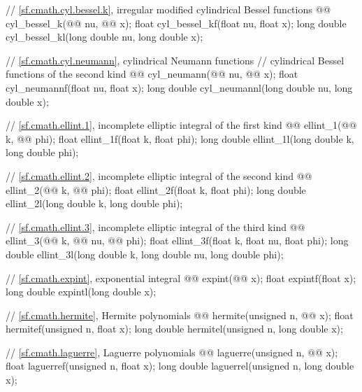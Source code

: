 \begin{codeblock}
{  // \ref{sf.cmath.cyl.bessel.k}, irregular modified cylindrical Bessel functions
  @@ cyl_bessel_k(@@ nu, @@ x);
  float        cyl_bessel_kf(float nu, float x);
  long double  cyl_bessel_kl(long double nu, long double x);

  // \ref{sf.cmath.cyl.neumann}, cylindrical Neumann functions
  // cylindrical Bessel functions of the second kind
  @@       cyl_neumann(@@ nu, @@ x);
  float        cyl_neumannf(float nu, float x);
  long double  cyl_neumannl(long double nu, long double x);

  // \ref{sf.cmath.ellint.1}, incomplete elliptic integral of the first kind
  @@ ellint_1(@@ k, @@ phi);
  float        ellint_1f(float k, float phi);
  long double  ellint_1l(long double k, long double phi);

  // \ref{sf.cmath.ellint.2}, incomplete elliptic integral of the second kind
  @@ ellint_2(@@ k, @@ phi);
  float        ellint_2f(float k, float phi);
  long double  ellint_2l(long double k, long double phi);

  // \ref{sf.cmath.ellint.3}, incomplete elliptic integral of the third kind
  @@ ellint_3(@@ k, @@ nu,
                                 @@ phi);
  float        ellint_3f(float k, float nu, float phi);
  long double  ellint_3l(long double k, long double nu, long double phi);

  // \ref{sf.cmath.expint}, exponential integral
  @@ expint(@@ x);
  float        expintf(float x);
  long double  expintl(long double x);

  // \ref{sf.cmath.hermite}, Hermite polynomials
  @@ hermite(unsigned n, @@ x);
  float        hermitef(unsigned n, float x);
  long double  hermitel(unsigned n, long double x);

  // \ref{sf.cmath.laguerre}, Laguerre polynomials
  @@ laguerre(unsigned n, @@ x);
  float        laguerref(unsigned n, float x);
  long double  laguerrel(unsigned n, long double x);

}
\end{codeblock}

